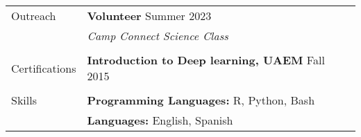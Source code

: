 \documentclass[letterpaper, 11pt]{article}
\begin{document}
\begin{longtable}{p{1.1in}p{6.05in}}
{\sc Outreach}
& \textbf{Volunteer} \hfill Summer 2023 \\
& \textit{Camp Connect Science Class} \\
& \\

{\sc Certifications}
& \textbf{Introduction to Deep learning, UAEM} \hfill  Fall 2015 \\
& \\

{\sc Skills}
& \textbf{Programming Languages:} R, Python, Bash \\

& \textbf{Languages:}  English, Spanish\\






\end{longtable}
\end{document}
